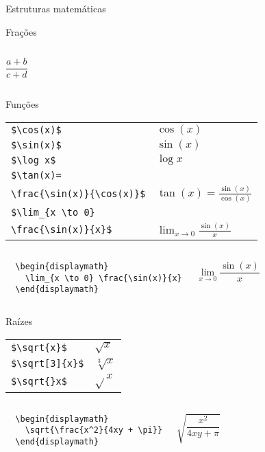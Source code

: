 \begin{frame}{Estruturas matemáticas}
\begin{block}{Frações}
\begin{columns}
{        \begin{displaymath}
        \frac{a+b}{c+d}
        \end{displaymath}
        }
    \end{columns}
    \end{block}

    \begin{block}{Funções}
     \small{
    \begin{tabular}{l l}
    \verb|$\cos(x)$|    & $\cos(x)$  \\
    \verb|$\sin(x)$|    & $\sin(x)$ \\
    \verb|$\log x$|     & $\log x$ \\
    \verb|$\tan(x)=| \\ \verb|\frac{\sin(x)}{\cos(x)}$|    & $\tan(x) = \frac{\sin(x)}{\cos(x)}$ \\
    \verb|$\lim_{x \to 0} | \\ \verb|\frac{\sin(x)}{x}$|  & $\lim_{x \to 0} \frac{\sin(x)}{x}$
    \end{tabular}
    }
    \begin{columns}
        \small{
\begin{verbatim}
  \begin{displaymath}
    \lim_{x \to 0} \frac{\sin(x)}{x}
  \end{displaymath}
\end{verbatim}
        }
        \small{
        \begin{displaymath}
        \lim_{x \to 0} \frac{\sin(x)}{x}
        \end{displaymath}
        }
    \end{columns}
    \end{block}

    \begin{block}{Raízes}
    \small{
    \begin{tabular}{l l}
    \verb|$\sqrt{x}$|       &   $\sqrt{x}$ \\
    \verb|$\sqrt[3]{x}$|    &   $\sqrt[3]{x}$ \\
    \verb|$\sqrt{}x$|        &   $\sqrt{}x$
    \end{tabular}
    }
    \begin{columns}
        \small{
\begin{verbatim}
  \begin{displaymath}
    \sqrt{\frac{x^2}{4xy + \pi}}
  \end{displaymath}
\end{verbatim}
        }
        \small{
        \begin{displaymath}
        \sqrt{\frac{x^2}{4xy + \pi}}
        \end{displaymath}
        }
    \end{columns}
    \end{block}


\end{frame}
